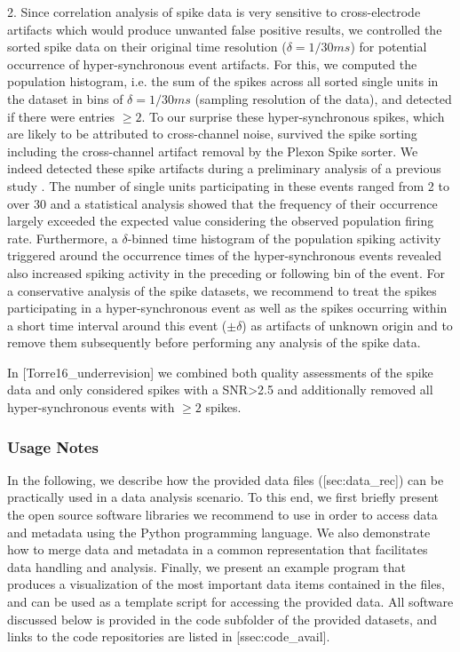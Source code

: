 {2. Since correlation analysis of spike data is very sensitive to cross-electrode artifacts which would produce unwanted false positive results, we controlled the sorted spike data on their original time resolution ($\delta=1/30ms$) for potential occurrence of hyper-synchronous event artifacts. For this, we computed the population histogram, i.e. the sum of the spikes across all sorted single units in the dataset in bins of $\delta=1/30ms$ (sampling resolution of the data), and detected if there were entries $\ge2$. To our surprise these hyper-synchronous spikes, which are likely to be attributed to cross-channel noise, survived the spike sorting including the cross-channel artifact removal by the Plexon Spike sorter. We indeed detected these spike artifacts during a preliminary analysis of a previous study . The number of single units participating in these events ranged from 2 to over 30 and a statistical analysis showed that the frequency of their occurrence largely exceeded the expected value considering the observed population firing rate. Furthermore, a $\delta$-binned time histogram of the population spiking activity triggered around the occurrence times of the hyper-synchronous events revealed also increased spiking activity in the preceding or following bin of the event. For a conservative analysis of the spike datasets, we recommend to treat the spikes participating in a hyper-synchronous event as well as the spikes occurring within a short time interval around this event (${\scriptstyle \pm\delta}$) as artifacts of unknown origin and to remove them subsequently before performing any analysis of the spike data.

In [Torre16\_underrevision] we combined both quality assessments of the spike data and only considered spikes with a SNR>2.5 and additionally removed all hyper-synchronous events with $\ge2$ spikes. 

\subsubsection{Usage Notes}

In the following, we describe how the provided data files ([sec:data\_rec]) can be practically used in a data analysis scenario. To this end, we first briefly present the open source software libraries we recommend to use in order to access data and metadata using the Python programming language. We also demonstrate how to merge data and metadata in a common representation that facilitates data handling and analysis. Finally, we present an example program that produces a visualization of the most important data items contained in the files, and can be used as a template script for accessing the provided data. All software discussed below is provided in the code subfolder of the provided datasets, and links to the code repositories are listed in [ssec:code\_avail].

}
